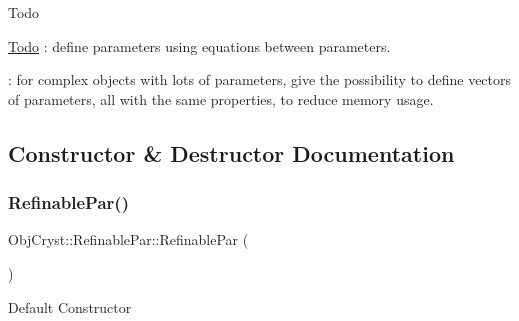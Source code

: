 \begin{DoxyRefDesc}{Todo}
\item[\mbox{\hyperlink{todo__todo000001}{Todo}}]\+: define parameters using equations between parameters. 

\+: for complex objects with lots of parameters, give the possibility to define vectors of parameters, all with the same properties, to reduce memory usage. \end{DoxyRefDesc}


\subsection{Constructor \& Destructor Documentation}
\mbox{\label{class_obj_cryst_1_1_refinable_par_ae358698d7ab55d87df8af8781946f293}} 
\subsubsection{\texorpdfstring{RefinablePar()}{RefinablePar()}\hspace{0.1cm}{\footnotesize\ttfamily [1/3]}}
{\footnotesize\ttfamily Obj\+Cryst\+::\+Refinable\+Par\+::\+Refinable\+Par (\begin{DoxyParamCaption}{ }\end{DoxyParamCaption})}

Default Constructor \mbox{\label{class_obj_cryst_1_1_refinable_par_ac82759679653390c868ca7cbcb7e572c}} 
